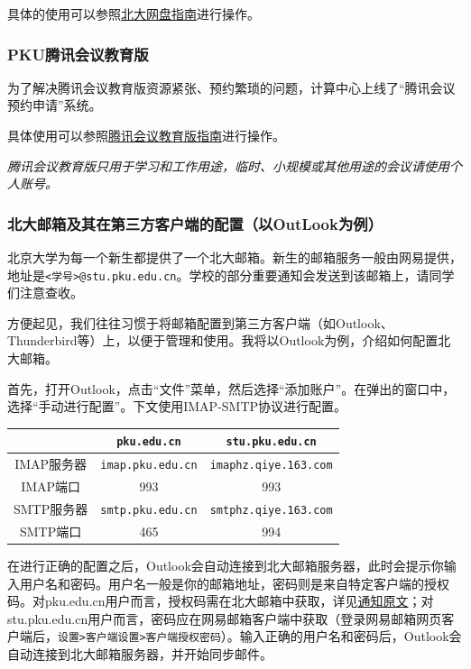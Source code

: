 \documentclass[../main.tex]{subfiles}
\begin{document}
具体的使用可以参照\href{https://its.pku.edu.cn/service_1_webdisk.jsp}{北大网盘指南}进行操作。

\subsubsection{PKU腾讯会议教育版}

为了解决腾讯会议教育版资源紧张、预约繁琐的问题，计算中心上线了“腾讯会议预约申请”系统。

具体使用可以参照\href{https://its.pku.edu.cn/service_1_webex.jsp}{腾讯会议教育版指南}进行操作。

\emph{腾讯会议教育版只用于学习和工作用途，临时、小规模或其他用途的会议请使用个人账号。}

\subsubsection{北大邮箱及其在第三方客户端的配置（以OutLook为例）}

北京大学为每一个新生都提供了一个北大邮箱。新生的邮箱服务一般由网易提供，地址是\texttt{<学号>@stu.pku.edu.cn}。学校的部分重要通知会发送到该邮箱上，请同学们注意查收。

方便起见，我们往往习惯于将邮箱配置到第三方客户端（如Outlook、Thunderbird等）上，以便于管理和使用。我将以Outlook为例，介绍如何配置北大邮箱。

首先，打开Outlook，点击“文件”菜单，然后选择“添加账户”。在弹出的窗口中，选择“手动进行配置”。下文使用IMAP-SMTP协议进行配置。

\begin{table}[ht]
  \centering
  \begin{tabular}{c|c|c}
    \hline
    & \texttt{pku.edu.cn} & \texttt{stu.pku.edu.cn} \\
    \hline
    IMAP服务器 & \texttt{imap.pku.edu.cn} & \texttt{imaphz.qiye.163.com} \\
    IMAP端口 & 993 & 993 \\
    \hline
    SMTP服务器 & \texttt{smtp.pku.edu.cn} & \texttt{smtphz.qiye.163.com} \\
    SMTP端口 & 465 & 994 \\
    \hline
  \end{tabular}
\end{table}

在进行正确的配置之后，Outlook会自动连接到北大邮箱服务器，此时会提示你输入用户名和密码。用户名一般是你的邮箱地址，密码则是来自特定客户端的授权码。对pku.edu.cn用户而言，授权码需在北大邮箱中获取，详见\href{https://its.pku.edu.cn/announce/tz20250702100126.jsp}{通知原文}；对stu.pku.edu.cn用户而言，密码应在网易邮箱客户端中获取（登录网易邮箱网页客户端后，\texttt{设置>客户端设置>客户端授权密码}）。输入正确的用户名和密码后，Outlook会自动连接到北大邮箱服务器，并开始同步邮件。
\end{document}
